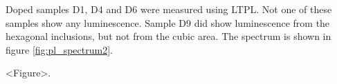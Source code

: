 Doped samples D1, D4 and D6 were measured using LTPL. Not one of these samples show any luminescence. Sample D9 did show luminescence from the hexagonal inclusions, but not from the cubic area. The spectrum is shown in figure \ref{fig:pl_spectrum2}. 

<Figure>.


































